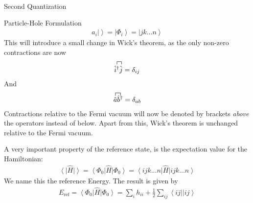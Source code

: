 \documentclass[twoside,english]{uiofysmaster}
\begin{document}
\begin{chapter}{Second Quantization}
\begin{section}{Particle-Hole Formulation}
		\begin{align}
			\hat a_i \left| \right> = \left| \Phi_i \right> = \left| jk ... n \right>
		\end{align}
		This will introduce a small change in Wick's theorem, as the only non-zero contractions are now 
		\begin{align}
			\contraction{}{\hat i^\dagger}{}{\hat j}
			\hat i^\dagger \hat j = \delta_{ij}
		\end{align}
		And 
		\begin{align}
			\contraction{}{\hat a}{}{\hat b^\dagger}
			\hat a \hat b^\dagger = \delta_{ab}
		\end{align}
		Contractions relative to the Fermi vacuum will now be denoted by brackets \textit{above} the operators instead of below. Apart from this, Wick's theorem is unchanged relative to the Fermi vacuum. \par 


		A very important property of the reference state, is the expectation value for the Hamiltonian: 
		\begin{align}
			\left< \right| \hat H \left| \right> = \left< \Phi_0 \right| \hat H \left| \Phi_0 \right> = \left< ijk...n \right| \hat H \left| ijk...n\right> 
		\end{align}
		We name this the reference Energy. The result is given by \cite{ShavittAndBartlett}
		\begin{align}
			E_{\text{ref}} = \left< \Phi_0 \right| \hat H \left| \Phi_0 \right> = \sum_i h_{ii} + \frac{1}{2} \sum_{ij} \left< ij || ij \right>
		\end{align}

	\end{section}


\end{chapter}
\end{document}
